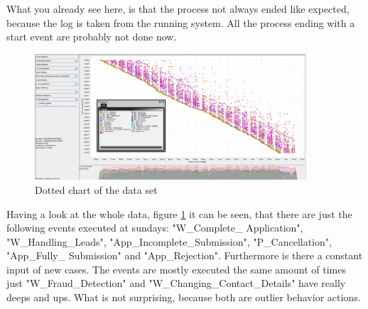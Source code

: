 What you already see here, is that the process not always ended like expected, because the log is taken from the running system. All the process ending with a start event are probably not done now. 


\begin{figure}[!htbp]
\centering
\includegraphics[width = 0.9\textwidth]{TotalDataDot.PNG}
\caption{Dotted chart of the data set}
\label{fig:WholeDat}
\end{figure}

Having a look at the whole data, figure \ref{fig:WholeDat} it can be seen, that there are just the following events executed at sundays: "W\_Complete\_ Application", "W\_Handling\_Leads", "App\_Incomplete\_Submission", "P\_Cancellation", "App\_Fully\_ Submission" and "App\_Rejection". Furthermore is there a constant input of new cases. The events are mostly executed the same amount of times just "W\_Fraud\_Detection" and "W\_Changing\_Contact\_Details" have really deeps and ups. What is not surprising, because both are outlier behavior actions.